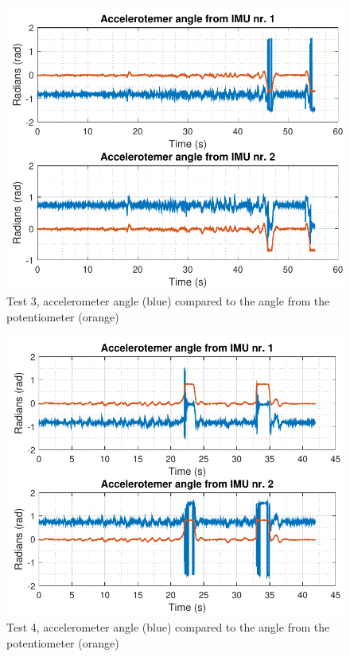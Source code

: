 \begin{figure}[H] 
	\centering 
	\includegraphics[scale=0.8]{figures/acc3}
	\caption{Test 3, accelerometer angle (blue) compared to the angle from the potentiometer (orange)}
	\label{data3acc}
\end{figure}
\begin{figure}[H] 
	\centering 
	\includegraphics[scale=0.8]{figures/acc4}
	\caption{Test 4, accelerometer angle (blue) compared to the angle from the potentiometer (orange)}
	\label{data4acc}
\end{figure}

